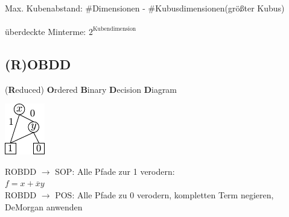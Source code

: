 \documentclass[6pt,a4paper]{scrartcl}
\newcommand{\ra}[0]{\ensuremath{\rightarrow}} 									%
\begin{document}
\begin{multicols}{3}
{	\\
	Max. Kubenabstand: \#Dimensionen - \#Kubusdimensionen(größter Kubus) \\
	} \\
	überdeckte Minterme: $2^{\text{Kubendimension}}$
	\subsection{(R)OBDD}
	(\textbf{R}educed) \textbf{O}rdered \textbf{B}inary \textbf{D}ecision \textbf{D}iagram\\
	\parbox{2.0cm}{ \includegraphics{./img/ds/robdd.pdf} }
	\parbox{5.0cm}{ ROBDD $\rightarrow$ SOP: Alle Pfade zur 1 verodern:\\ $f = x + \overline xy$ \\ 
					ROBDD $ \ra$ POS: Alle Pfade zu 0 verodern, kompletten Term negieren, DeMorgan anwenden} \\
	



\end{multicols}
\end{document}
